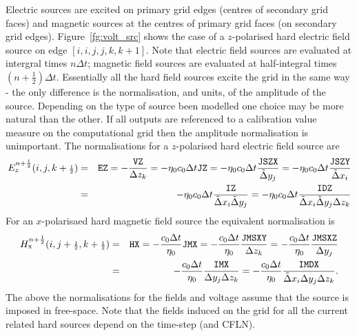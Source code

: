 \documentclass[onecolumn,a4paper]{article}
\newcommand{\half}{ {\scriptstyle \frac{1}{2}} }
\numberwithin{equation}{section}
\begin{document}
Electric sources are excited on primary grid edges (centres of secondary grid faces) 
and magnetic sources at the centres of primary grid faces (on secondary grid edges). 
Figure~\ref{fg:volt_src} shows the case of a $z$-polarised hard electric 
field source on edge $[i,i,j,j,k,k+1]$. Note that electric field sources are evaluated 
at intergral times $n \Delta t$; magnetic field sources are evaluated at half-integral times
$(n+\half) \Delta t$.
Essentially all the hard field sources excite the grid in the same way - the only difference
is the normalisation, and units, of the amplitude of the source. Depending on the type of
source been modelled one choice may be more natural than the other. If all outputs are
referenced to a calibration value measure on the computational grid then the amplitude
normalisation is unimportant. The normalisations for a $z$-polarised hard electric
field source are
\begin{eqnarray}
E^{n+\half}_z(i,j,k+\half) 
&=& \mathtt{EZ}
= -\frac{\mathtt{VZ}}{\Delta z_k}
= -\eta_0 c_0 \Delta t \mathtt{JZ}
= -\eta_0 c_0 \Delta t \frac{\mathtt{JSZX}}{\tDelta y_j}
= -\eta_0 c_0 \Delta t \frac{\mathtt{JSZY}}{\tDelta x_i} \nonumber \\
&=& -\eta_0 c_0 \Delta t \frac{\mathtt{IZ}}{\tDelta x_i \tDelta y_j}
= -\eta_0 c_0 \Delta t \frac{\mathtt{IDZ}}{\tDelta x_i \tDelta y_j \Delta z_k}
\end{eqnarray}
For an $x$-polarisaed hard magnetic field source the equivalent normalisation is
\begin{eqnarray}
H^{n+\half}_\mathrm{x}(i,j+\half,k+\half) 
&=& \mathtt{HX}
= -\frac{c_0 \Delta t}{\eta_0}\mathtt{JMX}
= -\frac{c_0 \Delta t}{\eta_0}\frac{\mathtt{JMSXY}}{\Delta z_k}
= -\frac{c_0 \Delta t}{\eta_0}\frac{\mathtt{JMSXZ}}{\Delta y_j} \nonumber \\
&=& -\frac{c_0 \Delta t}{\eta_0}\frac{\mathtt{IMX}}{\Delta y_j \Delta z_k}
= -\frac{c_0 \Delta t}{\eta_0}\frac{\mathtt{IMDX}}{\tDelta x_i \Delta y_j \Delta z_k}.
\end{eqnarray}
The above the normalisations for the fields and voltage assume that the source is imposed 
in free-space. Note that the fields induced on the grid for all the current related hard sources
depend on the time-step (and CFLN).
\end{document}
